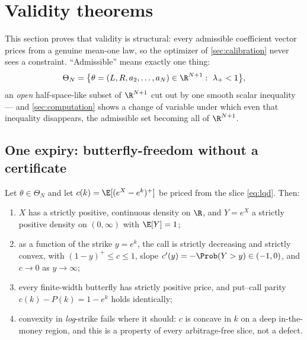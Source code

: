 \section{Validity theorems}
\label{sec:validity}

This section proves that validity is structural: every admissible
coefficient vector prices from a genuine mean-one law, so the optimizer of
\cref{sec:calibration} never sees a constraint.  ``Admissible'' means
exactly one thing:
\begin{equation}
\Theta_N=\big\{\theta=(L,R,a_2,\dots,a_N)\in\R^{N+1}:\ \lambda_+<1\big\},
\label{eq:admissible}
\end{equation}
an \emph{open} half-space-like subset of $\R^{N+1}$ cut out by one smooth
scalar inequality --- and \cref{sec:computation} shows a change of variable
under which even that inequality disappears, the admissible set becoming
all of $\R^{N+1}$.

\subsection{One expiry: butterfly-freedom without a certificate}

\begin{proposition}
\label{prop:noarb}
Let $\theta\in\Theta_N$ and let $c(k)=\E[(e^{X}-e^{k})^{+}]$ be priced from
the slice \eqref{eq:lqd}.  Then:
\begin{enumerate}[leftmargin=1.6em,label=(\roman*)]
\item $X$ has a strictly positive, continuous density on $\R$, and
$Y=e^{X}$ a strictly positive density on $(0,\infty)$ with $\E[Y]=1$;
\item as a function of the strike $y=e^{k}$, the call is strictly
decreasing and strictly convex, with $(1-y)^{+}\le c\le1$, slope
$c'(y)=-\Prob(Y>y)\in(-1,0)$, and $c\to0$ as $y\to\infty$;
\item every finite-width butterfly has strictly positive price, and
put--call parity $c(k)-P(k)=1-e^{k}$ holds identically;
\item convexity in \emph{log}-strike fails where it should: $c$ is concave
in $k$ on a deep in-the-money region, and this is a property of every
arbitrage-free slice, not a defect.
\end{enumerate}
\end{proposition}

